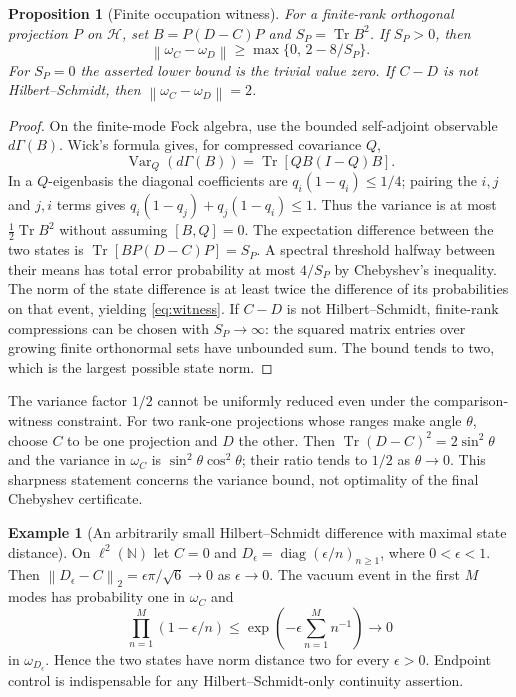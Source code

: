 \documentclass[11pt]{article}
\newcommand{\Tr}{\operatorname{Tr}}
\newcommand{\norm}[1]{\left\|#1\right\|}
\newtheorem{proposition}[theorem]{Proposition}
\theoremstyle{definition}
\newtheorem{example}[theorem]{Example}
\begin{document}
\begin{proposition}[Finite occupation witness]
\label{prop:witness}
For a finite-rank orthogonal projection $P$ on $\mathcal H$, set
$B=P(D-C)P$ and $S_P=\Tr B^2$. If $S_P>0$, then
\begin{equation}
\norm{\omega_C-\omega_D}\ge
\max\{0,\,2-8/S_P\}.
\label{eq:witness}
\end{equation}
For $S_P=0$ the asserted lower bound is the trivial value zero.
If $C-D$ is not Hilbert--Schmidt, then
$\norm{\omega_C-\omega_D}=2$.
\end{proposition}
\begin{proof}
On the finite-mode Fock algebra, use the bounded self-adjoint observable
$d\Gamma(B)$. Wick's formula gives, for compressed covariance $Q$,
\[
\operatorname{Var}_Q(d\Gamma(B))
=\Tr[QB(I-Q)B].
\]
In a $Q$-eigenbasis the diagonal coefficients are $q_i(1-q_i)\le1/4$;
pairing the $i,j$ and $j,i$ terms gives
$q_i(1-q_j)+q_j(1-q_i)\le1$. Thus the variance is at most
$\tfrac12\Tr B^2$ without assuming $[B,Q]=0$.
The expectation difference between the two states is
$\Tr[B P(D-C)P]=S_P$. A spectral threshold halfway between their means
has total error probability at most $4/S_P$ by Chebyshev's inequality.
The norm of the state difference is at least twice the difference of its
probabilities on that event, yielding \eqref{eq:witness}. If $C-D$ is not
Hilbert--Schmidt, finite-rank compressions can be chosen with $S_P\to\infty$:
the squared matrix entries over growing finite orthonormal sets have unbounded
sum. The bound tends to two, which is the largest possible state norm.
\end{proof}

The variance factor $1/2$ cannot be uniformly reduced even under the
comparison-witness constraint. For two rank-one projections whose ranges
make angle $\theta$, choose $C$ to be one projection and $D$ the other. Then
$\Tr(D-C)^2=2\sin^2\theta$ and the variance in $\omega_C$ is
$\sin^2\theta\cos^2\theta$; their ratio tends to $1/2$ as
$\theta\to0$. This sharpness statement concerns the variance bound, not
optimality of the final Chebyshev certificate.

\begin{example}[An arbitrarily small Hilbert--Schmidt difference with maximal state distance]
\label{ex:endpoint}
On $\ell^2(\mathbb N)$ let $C=0$ and
$D_\epsilon=\operatorname{diag}(\epsilon/n)_{n\ge1}$, where $0<\epsilon<1$.
Then $\norm{D_\epsilon-C}_2=\epsilon\pi/\sqrt6\to0$ as
$\epsilon\to0$. The vacuum event in the first $M$ modes has probability
one in $\omega_C$ and
\[
\prod_{n=1}^M(1-\epsilon/n)
\le\exp\left(-\epsilon\sum_{n=1}^M n^{-1}\right)\longrightarrow0
\]
in $\omega_{D_\epsilon}$. Hence the two states have norm distance two
for every $\epsilon>0$. Endpoint control is indispensable for any
Hilbert--Schmidt-only continuity assertion.
\end{example}
\end{document}

